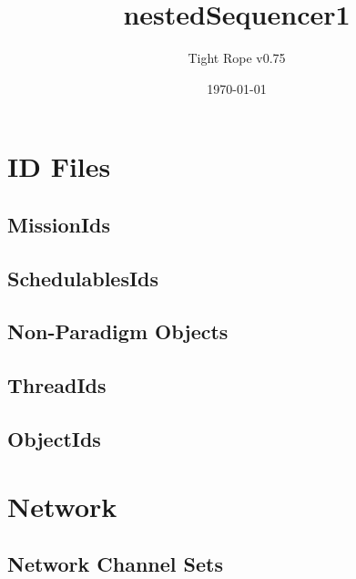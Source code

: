 \documentclass[10pt,a4paper]{article}
\title{nestedSequencer1}
\author{Tight Rope v0.75}
\date{\today}
\begin{document}
\maketitle

\section{ID Files}
\subsection{MissionIds}

\newpage

\subsection{SchedulablesIds}

\newpage

\subsection{Non-Paradigm Objects}
\newpage

\subsection{ThreadIds}

\newpage

\subsection{ObjectIds}

\newpage

\section{Network}
\subsection{Network Channel Sets}




{}
\end{document}
